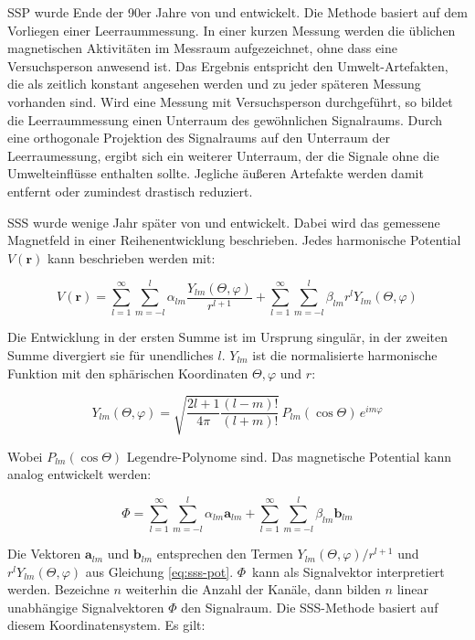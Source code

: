 \documentclass[doc,a4paper,12pt]{apa6}
\newcommand{\mx}[1]{\mathbf{#1}}
\begin{document}
SSP wurde Ende der 90er Jahre von \textcite{uusitalo1997signal} und \textcite{parkkonen1999interference} entwickelt. Die Methode basiert auf dem Vorliegen einer Leerraummessung. In einer kurzen Messung werden die üblichen magnetischen Aktivitäten im Messraum aufgezeichnet, ohne dass eine Versuchsperson anwesend ist. Das Ergebnis entspricht den Umwelt-Artefakten, die als zeitlich konstant angesehen werden und zu jeder späteren Messung vorhanden sind. Wird eine Messung mit Versuchsperson durchgeführt, so bildet die Leerraummessung einen Unterraum des gewöhnlichen Signalraums. Durch eine orthogonale Projektion des Signalraums auf den Unterraum der Leerraumessung, ergibt sich ein weiterer Unterraum, der die Signale ohne die Umwelteinflüsse enthalten sollte. Jegliche äußeren Artefakte werden damit entfernt oder zumindest drastisch reduziert.

SSS wurde wenige Jahr später von \textcite{taulu2004suppression} und \textcite{taulu2005presentation} entwickelt. Dabei wird das gemessene Magnetfeld in einer Reihenentwicklung beschrieben. Jedes harmonische Potential $V(\mx{r})$ kann beschrieben werden mit:

\begin{equation}
V(\mx{r}) = \sum_{l=1}^\infty \sum_{m=-l}^l \alpha_{lm} \frac{Y_{lm}(\Theta, \varphi)}{r^{l+1}} + \sum_{l=1}^\infty \sum_{m=-l}^l \beta_{lm} r^l Y_{lm}(\Theta, \varphi) 
\label{eq:sss-pot}
\end{equation}

Die Entwicklung in der ersten Summe ist im Ursprung singulär, in der zweiten Summe divergiert sie für unendliches $l$. $Y_{lm}$ ist die normalisierte harmonische Funktion mit den sphärischen Koordinaten $\Theta, \varphi$ und $r$:

\begin{equation}
Y_{lm}(\Theta, \varphi) = \sqrt{\frac{2l+1}{4\pi} \frac{(l-m)!}{(l+m)!}}\, P_{lm}(\cos{\Theta})\,e^{im\varphi}
\end{equation}

Wobei $P_{lm}(\cos{\Theta})$ Legendre-Polynome sind. Das magnetische Potential kann analog entwickelt werden:

\begin{equation}
\Phi = \sum_{l=1}^\infty \sum_{m=-l}^l \alpha_{lm} \mx{a}_{lm} + \sum_{l=1}^\infty \sum_{m=-l}^l \beta_{lm} \mx{b}_{lm}
\label{eq:sss-magpot}
\end{equation}

Die Vektoren $\mx{a}_{lm}$ und $\mx{b}_{lm}$ entsprechen den Termen $Y_{lm}(\Theta, \varphi)/r^{l+1}$ und $r^l Y_{lm}(\Theta, \varphi)$ aus Gleichung \ref{eq:sss-pot}. $\Phi$~kann als Signalvektor interpretiert werden. Bezeichne $n$ weiterhin die Anzahl der Kanäle, dann bilden $n$ linear unabhängige Signalvektoren $\Phi$ den Signalraum. Die SSS-Methode basiert auf diesem Koordinatensystem. Es gilt:
\end{document}
